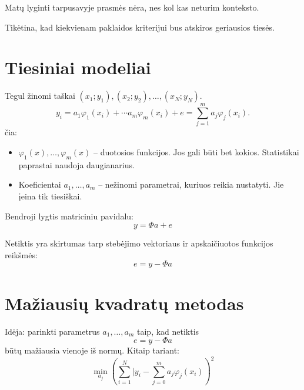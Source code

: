 

Matų lyginti tarpusavyje prasmės nėra, nes kol kas neturim konteksto.

Tikėtina, kad kiekvienam paklaidos kriterijui bus atskiros geriausios
tiesės.

\section{Tiesiniai modeliai}


\begin{prop}
  Tegul žinomi taškai $(x_{1};y_{1}), (x_{2};y_{2}),\ldots,(x_{N};y_{N})$.
  \begin{equation*}
    y_{i} = a_{1}\varphi_{1}(x_{i}) + \cdots a_{m}\varphi_{m}(x_{i}) + e
    = \sum_{j=1}^{m}a_{j}\varphi_{j}(x_{i}).
  \end{equation*}
  čia:
  \begin{itemize}
    \item $\varphi_{1}(x),\ldots,\varphi_{m}(x)$ – duotosios
      funkcijos. Jos gali būti bet kokios. Statistikai paprastai naudoja
      daugianarius.
    \item Koeficientai $a_{1},\ldots,a_{m}$ – nežinomi parametrai, kuriuos
      reikia nustatyti. Jie įeina tik tiesiškai.
  \end{itemize}
\end{prop}


Bendroji lygtis matriciniu pavidalu:
\begin{equation*}
  y = \Phi a + e
\end{equation*}

Netiktis yra skirtumas tarp stebėjimo vektoriaus ir apskaičiuotos funkcijos
reikšmės:
\begin{equation*}
  e = y - \Phi a
\end{equation*}

\section{Mažiausių kvadratų metodas}


Idėja: parinkti parametrus $a_{1},\ldots,a_{m}$ taip, kad netiktis
\begin{equation*}
  e = y - \Phi a
\end{equation*}
būtų mažiausia vienoje iš normų. Kitaip tariant:
\begin{equation*}
  \min _{a_{j}} \left(
    \sum_{i=1}^{N}|y_{i} - \sum_{j=0}^{m} a_{j}\varphi_{j}(x_{i})
  \right)^{2}
\end{equation*}

